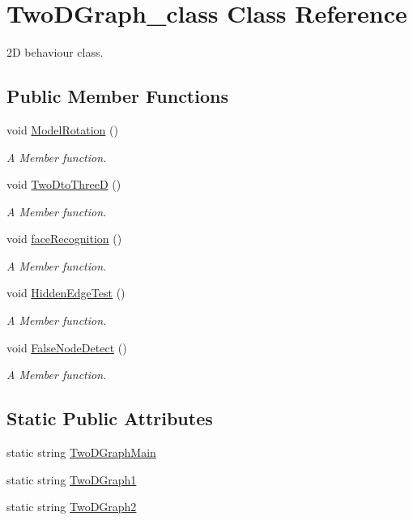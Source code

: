 \hypertarget{classTwoDGraph__class}{}\section{Two\+D\+Graph\+\_\+class Class Reference}
\label{classTwoDGraph__class}


2D behaviour class.  


\subsection*{Public Member Functions}
\begin{DoxyCompactItemize}
\item 
void \hyperlink{classTwoDGraph__class_ac9bc0b813d3d557af8c22f49b5b24444}{Model\+Rotation} ()
\begin{DoxyCompactList}\small\item\em A Member function. \end{DoxyCompactList}\item 
void \hyperlink{classTwoDGraph__class_a48222790dda1c34caf1366ce1cc0ce1d}{Two\+Dto\+ThreeD} ()
\begin{DoxyCompactList}\small\item\em A Member function. \end{DoxyCompactList}\item 
void \hyperlink{classTwoDGraph__class_af0b7cb652fec315e79e0f4826c64ae6d}{face\+Recognition} ()
\begin{DoxyCompactList}\small\item\em A Member function. \end{DoxyCompactList}\item 
void \hyperlink{classTwoDGraph__class_a551441ccdbceddd7c5d7df8c3a0a3e04}{Hidden\+Edge\+Test} ()
\begin{DoxyCompactList}\small\item\em A Member function. \end{DoxyCompactList}\item 
void \hyperlink{classTwoDGraph__class_aac6062b9859be331a44d1fe61036d5a1}{False\+Node\+Detect} ()
\begin{DoxyCompactList}\small\item\em A Member function. \end{DoxyCompactList}\end{DoxyCompactItemize}
\subsection*{Static Public Attributes}
\begin{DoxyCompactItemize}
\item 
static string \hyperlink{classTwoDGraph__class_aec0627f5c9c38a4b1bfe6aeec7e0237b}{Two\+D\+Graph\+Main}
\item 
static string \hyperlink{classTwoDGraph__class_a5ca4ece6cefc90e4b73be743f9292d06}{Two\+D\+Graph1}
\item 
static string \hyperlink{classTwoDGraph__class_ade9259accbf5d06b05e65429dfde4ed5}{Two\+D\+Graph2}
\end{DoxyCompactItemize}


